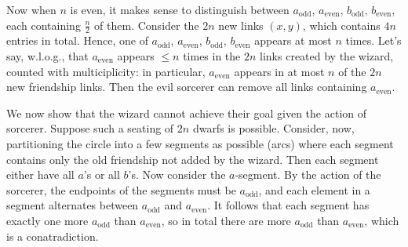 \documentclass[11pt,a4paper]{article}
\begin{document}
\begin{enumerate}
	Now when $n$ is even, it makes sense to distinguish between $a_{\text{odd}}$, $a_{\text{even}}$, $b_{\text{odd}}$, $b_{\text{even}}$, each containing $\frac{n}{2}$ of them. 
	Consider the $2n$ new links $(x, y)$, which contains $4n$ entries in total. 
	Hence, one of $a_{\text{odd}}$, $a_{\text{even}}$, $b_{\text{odd}}$, $b_{\text{even}}$ appears at most $n$ times. 
	Let's say, w.l.o.g., that $a_{\text{even}}$ appears $\le n$ times in the $2n$ links created by the wizard, 
	counted with multiciplicity: in particular, $a_{\text{even}}$ appears in at most $n$ of the $2n$ new friendship links. 
	Then the evil sorcerer can remove all links containing $a_{\text{even}}$. 
	
	We now show that the wizard cannot achieve their goal given the action of  sorcerer. 
	Suppose such a seating of $2n$ dwarfs is possible. 
	Consider, now, partitioning the circle into a few segments as possible (arcs) where each segment contains only the old friendship not added by the wizard. 
	Then each segment either have all $a$'s or all $b$'s. 
	Now consider the $a$-segment. By the action of the sorcerer, 
	the endpoints of the segments must be $a_{\text{odd}}$, 
	and each element in a segment alternates between $a_{\text{odd}}$ and $a_{\text{even}}$. 
	It follows that each segment has exactly one more $a_{\text{odd}}$ than $a_{\text{even}}$, 
	so in total there are more $a_{\text{odd}}$ than $a_{\text{even}}$, 
	which is a conatradiction. 
	
\end{enumerate}
\end{document}
